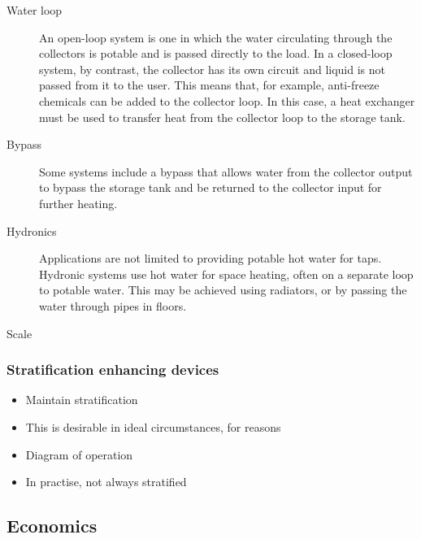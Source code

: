 \begin{description}
   \item[Water loop] An open-loop system is one in which the water circulating through the collectors is potable and is passed directly to the load.
      In a closed-loop system, by contrast, the collector has its own circuit and liquid is not passed from it to the user.
      This means that, for example, anti-freeze chemicals can be added to the collector loop.
      In this case, a heat exchanger must be used to transfer heat from the collector loop to the storage tank.

   \item[Bypass] Some systems include a bypass  that allows water from the collector output to bypass the storage tank and be returned to the collector input for further heating.

   \item[Hydronics] Applications are not limited to providing potable hot water for taps.
      Hydronic systems use hot water for space heating, often on a separate loop to potable water.
      This may be achieved using radiators, or by passing the water through pipes in floors.

   \item[Scale] 
\end{description}

\subsubsection{Stratification enhancing devices}
\label{sec:background:stratifiers}


\begin{itemize}
	\item Maintain stratification
	\item This is desirable in ideal circumstances, for reasons
	\item Diagram of operation
	\item In practise, not always stratified
\end{itemize}

\subsection{Economics}

